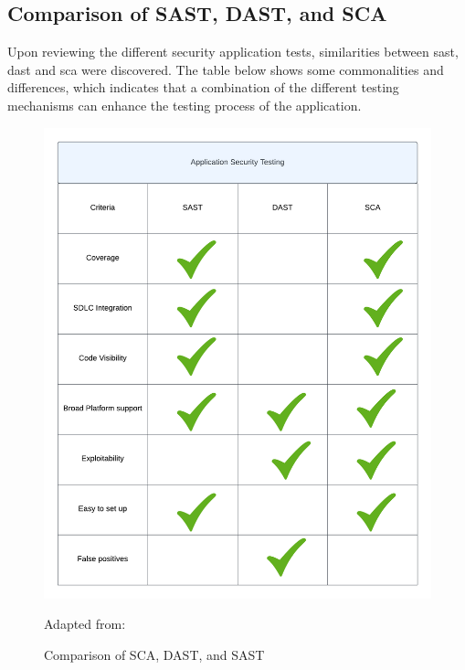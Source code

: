 \newpage
\subsection{Comparison of SAST, DAST, and SCA}
Upon reviewing the different security application tests, similarities between \acrshort{sast}, \acrshort{dast} and \acrshort{sca} were discovered. The table below shows some commonalities and differences, which indicates that a combination of the different testing mechanisms can enhance the testing process of the application. 

\vspace{2mm}
\begin{figure}[H]
    \centering
    \includegraphics[width=0.8\columnwidth]{Images/ApplicationSecurityTesting.png}
    \caption{Comparison of SCA, DAST, and SAST}Adapted from: \cite{Comparison}
    \label{fig: Comparison of SCA, DAST, and SASt}
\end{figure}

